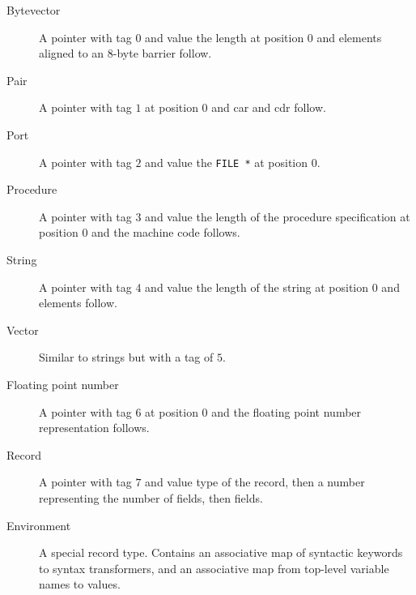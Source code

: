 \documentclass{article}
\begin{document}
\begin{description}
\item[Bytevector] A pointer with tag $0$ and value the length at
  position $0$ and elements aligned to an 8-byte barrier follow.
\item[Pair] A pointer with tag $1$ at position $0$ and car and cdr
  follow.
\item[Port] A pointer with tag $2$ and value the \verb|FILE *| at
  position $0$.
\item[Procedure] A pointer with tag $3$ and value the length of the
  procedure specification at position $0$ and the machine code follows.
\item[String] A pointer with tag $4$ and value the length of the
  string at position $0$ and elements follow.
\item[Vector] Similar to strings but with a tag of $5$.
\item[Floating point number] A pointer with tag $6$ at position $0$
  and the floating point number representation follows.
\item[Record] A pointer with tag $7$ and value type of the record,
  then a number representing the number of fields, then fields.
\item[Environment] A special record type. Contains an associative map
  of syntactic keywords to syntax transformers, and an associative map
  from top-level variable names to values.
\end{description}
\end{document}
